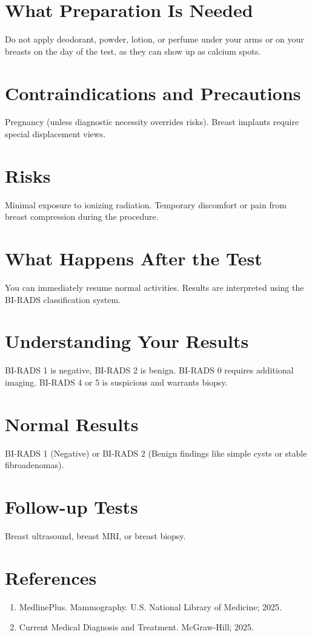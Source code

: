 \section*{What Preparation Is Needed}
Do not apply deodorant, powder, lotion, or perfume under your arms or on your breasts on the day of the test, as they can show up as calcium spots.

\section*{Contraindications and Precautions}
Pregnancy (unless diagnostic necessity overrides risks). Breast implants require special displacement views.

\section*{Risks}
Minimal exposure to ionizing radiation. Temporary discomfort or pain from breast compression during the procedure.

\section*{What Happens After the Test}
You can immediately resume normal activities. Results are interpreted using the BI-RADS classification system.

\section*{Understanding Your Results}
BI-RADS 1 is negative, BI-RADS 2 is benign. BI-RADS 0 requires additional imaging. BI-RADS 4 or 5 is suspicious and warrants biopsy.

\section*{Normal Results}
BI-RADS 1 (Negative) or BI-RADS 2 (Benign findings like simple cysts or stable fibroadenomas).

\section*{Follow-up Tests}
Breast ultrasound, breast MRI, or breast biopsy.

\section*{References}
\begin{enumerate}
  \item MedlinePlus. Mammography. U.S. National Library of Medicine; 2025.
  \item Current Medical Diagnosis and Treatment. McGraw-Hill; 2025.
\end{enumerate}

\clearpage
